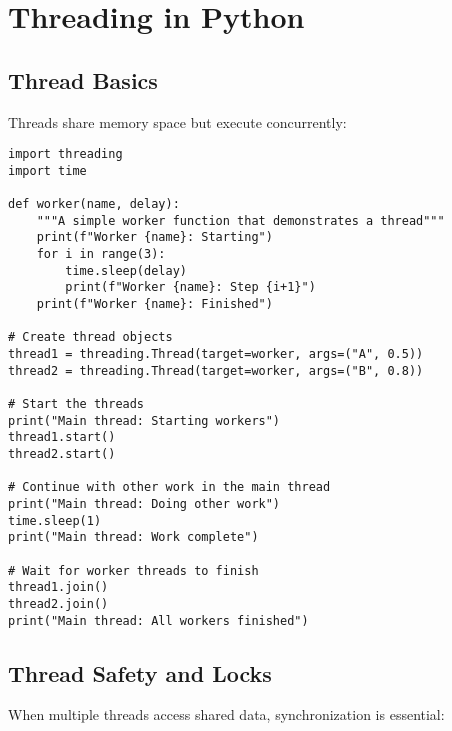 \documentclass[12pt,letterpaper]{article}
\newenvironment{macterminal}{%
    \begin{mdframed}[
        linecolor=terminalFrame,
        backgroundcolor=terminalBg,
        roundcorner=5pt,
        skipabove=10pt,
        skipbelow=10pt,
        linewidth=1pt,
        innertopmargin=10pt, %
        frametitle={%
            \tikz[baseline=(current bounding box.east), outer sep=0pt]{
                \fill[red!80!black] (0,0) circle (5pt);
                \fill[yellow!80!black] (0.7,0) circle (5pt);
                \fill[green!70!black] (1.4,0) circle (5pt);
            }
        },
        frametitlealignment=\raggedright, %
        frametitleaboveskip=8pt, %
        frametitlebelowskip=0pt, %
    ]
}{%
    \end{mdframed}%
}
\begin{document}
\section{Threading in Python}

\subsection{Thread Basics}

Threads share memory space but execute concurrently:

\begin{macterminal}
\begin{lstlisting}
import threading
import time

def worker(name, delay):
    """A simple worker function that demonstrates a thread"""
    print(f"Worker {name}: Starting")
    for i in range(3):
        time.sleep(delay)
        print(f"Worker {name}: Step {i+1}")
    print(f"Worker {name}: Finished")

# Create thread objects
thread1 = threading.Thread(target=worker, args=("A", 0.5))
thread2 = threading.Thread(target=worker, args=("B", 0.8))

# Start the threads
print("Main thread: Starting workers")
thread1.start()
thread2.start()

# Continue with other work in the main thread
print("Main thread: Doing other work")
time.sleep(1)
print("Main thread: Work complete")

# Wait for worker threads to finish
thread1.join()
thread2.join()
print("Main thread: All workers finished")
\end{lstlisting}
\end{macterminal}

\subsection{Thread Safety and Locks}

When multiple threads access shared data, synchronization is essential:
\end{document}
